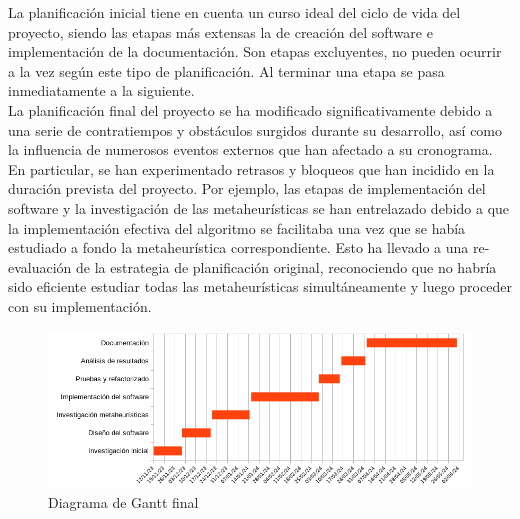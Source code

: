 La planificación inicial tiene en cuenta un curso ideal del ciclo de vida del proyecto, siendo las etapas más extensas la de creación del software e implementación de la documentación. Son etapas excluyentes, no pueden ocurrir a la vez según este tipo de planificación. Al terminar una etapa se pasa inmediatamente a la siguiente.\\[6pt]
La planificación final del proyecto se ha modificado significativamente debido a una serie de contratiempos y obstáculos surgidos durante su desarrollo, así como la influencia de numerosos eventos externos que han afectado a su cronograma. En particular, se han experimentado retrasos y bloqueos que han incidido en la duración prevista del proyecto. Por ejemplo, las etapas de implementación del software y la investigación de las metaheurísticas se han entrelazado debido a que la implementación efectiva del algoritmo se facilitaba una vez que se había estudiado a fondo la metaheurística correspondiente. Esto ha llevado a una re-evaluación de la estrategia de planificación original, reconociendo que no habría sido eficiente estudiar todas las metaheurísticas simultáneamente y luego proceder con su implementación.

\begin{figure}[H]
      \begin{center}
            \includegraphics[width=1\textwidth]{imagenes/gantt-init.png}
      \end{center}
      \caption{Diagrama de Gantt final}
\end{figure}

